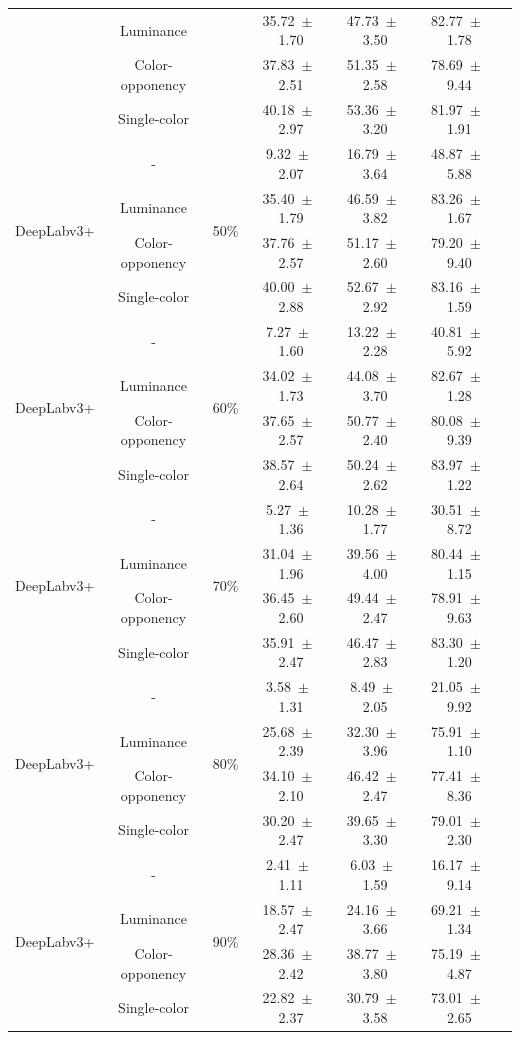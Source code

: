 \begin{table}[h]
\begin{tabular}{@{}lccc ccc@{}}
& Luminance & & 35.72~$\pm$~1.70 & 47.73~$\pm$~3.50 & 82.77~$\pm$~1.78 \\
& Color-opponency & & 37.83~$\pm$~2.51 & 51.35~$\pm$~2.58 & 78.69~$\pm$~9.44 \\
& Single-color & & 40.18~$\pm$~2.97 & 53.36~$\pm$~3.20 & 81.97~$\pm$~1.91 \\
\midrule
\multirow{4}{*}{DeepLabv3+} & - & \multirow{4}{*}{50\%} & 9.32~$\pm$~2.07 & 16.79~$\pm$~3.64 & 48.87~$\pm$~5.88 \\
& Luminance & & 35.40~$\pm$~1.79 & 46.59~$\pm$~3.82 & 83.26~$\pm$~1.67 \\
& Color-opponency & & 37.76~$\pm$~2.57 & 51.17~$\pm$~2.60 & 79.20~$\pm$~9.40 \\
& Single-color & & 40.00~$\pm$~2.88 & 52.67~$\pm$~2.92 & 83.16~$\pm$~1.59 \\
\midrule
\multirow{4}{*}{DeepLabv3+} & - & \multirow{4}{*}{60\%} & 7.27~$\pm$~1.60 & 13.22~$\pm$~2.28 & 40.81~$\pm$~5.92 \\
& Luminance & & 34.02~$\pm$~1.73 & 44.08~$\pm$~3.70 & 82.67~$\pm$~1.28 \\
& Color-opponency & & 37.65~$\pm$~2.57 & 50.77~$\pm$~2.40 & 80.08~$\pm$~9.39 \\
& Single-color & & 38.57~$\pm$~2.64 & 50.24~$\pm$~2.62 & 83.97~$\pm$~1.22 \\
\midrule
\multirow{4}{*}{DeepLabv3+} & - & \multirow{4}{*}{70\%} & 5.27~$\pm$~1.36 & 10.28~$\pm$~1.77 & 30.51~$\pm$~8.72 \\
& Luminance & & 31.04~$\pm$~1.96 & 39.56~$\pm$~4.00 & 80.44~$\pm$~1.15 \\
& Color-opponency & & 36.45~$\pm$~2.60 & 49.44~$\pm$~2.47 & 78.91~$\pm$~9.63 \\
& Single-color & & 35.91~$\pm$~2.47 & 46.47~$\pm$~2.83 & 83.30~$\pm$~1.20 \\
\midrule
\multirow{4}{*}{DeepLabv3+} & - & \multirow{4}{*}{80\%} & 3.58~$\pm$~1.31 & 8.49~$\pm$~2.05 & 21.05~$\pm$~9.92 \\
& Luminance & & 25.68~$\pm$~2.39 & 32.30~$\pm$~3.96 & 75.91~$\pm$~1.10 \\
& Color-opponency & & 34.10~$\pm$~2.10 & 46.42~$\pm$~2.47 & 77.41~$\pm$~8.36 \\
& Single-color & & 30.20~$\pm$~2.47 & 39.65~$\pm$~3.30 & 79.01~$\pm$~2.30 \\
\midrule
\multirow{4}{*}{DeepLabv3+} & - & \multirow{4}{*}{90\%} & 2.41~$\pm$~1.11 & 6.03~$\pm$~1.59 & 16.17~$\pm$~9.14 \\
& Luminance & & 18.57~$\pm$~2.47 & 24.16~$\pm$~3.66 & 69.21~$\pm$~1.34 \\
& Color-opponency & & 28.36~$\pm$~2.42 & 38.77~$\pm$~3.80 & 75.19~$\pm$~4.87 \\
& Single-color & & 22.82~$\pm$~2.37 & 30.79~$\pm$~3.58 & 73.01~$\pm$~2.65 \\
\midrule
\bottomrule
\end{tabular}
\label{tab:sparse_results_deeplabv3plus_acdc_rain}
\end{table}